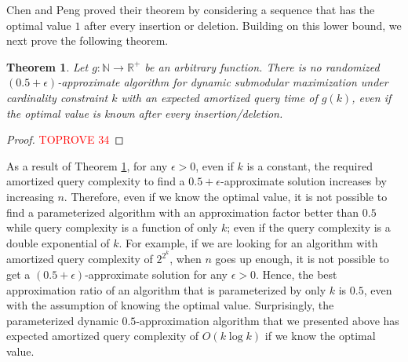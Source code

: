 \documentclass[11pt]{article}
\newtheorem{theorem}{Theorem}
\newcommand{\mO}{O}
\begin{document}
Chen and Peng proved their theorem by considering a sequence that has the optimal value $1$ after every insertion or deletion. 
Building on this lower bound, we next prove the following theorem. 

\begin{theorem}
\label{thm:lowerbound:general}
Let $g: \mathbb{N} \to \mathbb{R}^+$ be an arbitrary function.
There is no randomized $(0.5+\epsilon)$-approximate algorithm for dynamic submodular maximization under cardinality constraint $k$ 
with an expected amortized query time of $g(k)$, 
even if the optimal value is known after every insertion/deletion.
\end{theorem}



\begin{proof}\textcolor{red}{TOPROVE 34}\end{proof}

As a result of Theorem \ref{thm:lowerbound:general}, for any $\epsilon>0$, even if $k$ is a constant, the required amortized query complexity to find a $0.5+\epsilon$-approximate solution increases by increasing $n$.
Therefore, even if we know the optimal value, it is not possible to find a parameterized algorithm with an approximation factor better than $0.5$ while query complexity is a function of only $k$; even if the query complexity is a double exponential of $k$. For example, if we are looking for an algorithm with amortized query complexity of $2^{2^k}$, when $n$ goes up enough, it is not possible to get a $(0.5+\epsilon)$-approximate solution for any $\epsilon>0$. 
Hence, the best approximation ratio of an algorithm that is parameterized by only $k$ is $0.5$, even with the assumption of knowing the optimal value. 
Surprisingly, the parameterized dynamic $0.5$-approximation algorithm that we presented above has expected amortized query complexity of $\mO(k \log k)$ if we know the optimal value. 

%
 
\end{document}
